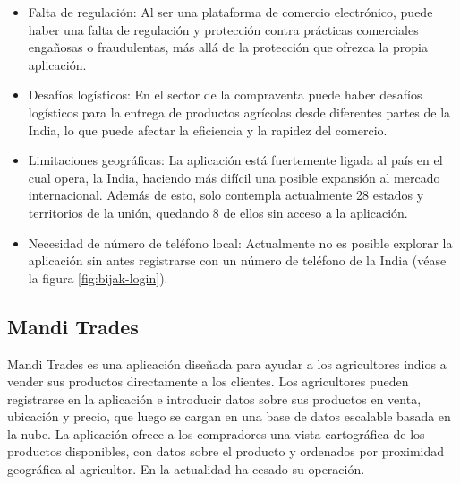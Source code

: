 \begin{itemize}

	\item Falta de regulación: Al ser una plataforma de comercio electrónico, puede haber una falta de regulación y protección contra prácticas comerciales engañosas o fraudulentas, más allá de la protección que ofrezca la propia aplicación.
	
	\item Desafíos logísticos: En el sector de la compraventa puede haber desafíos logísticos para la entrega de productos agrícolas desde diferentes partes de la India, lo que puede afectar la eficiencia y la rapidez del comercio.

	\item Limitaciones geográficas: La aplicación está fuertemente ligada al país en el cual opera, la India, haciendo más difícil una posible expansión al mercado internacional. Además de esto, solo contempla actualmente 28 estados y territorios de la unión, quedando 8 de ellos sin acceso a la aplicación.

	\item Necesidad de número de teléfono local: Actualmente no es posible explorar la aplicación sin antes registrarse con un número de teléfono de la India (véase la figura \ref{fig:bijak-login}).
	
\end{itemize}


\subsection{Mandi Trades}

Mandi Trades es una aplicación diseñada para ayudar a los agricultores indios a vender sus productos directamente a los clientes. Los agricultores pueden registrarse en la aplicación e introducir datos sobre sus productos en venta, ubicación y precio, que luego se cargan en una base de datos escalable basada en la nube. La aplicación ofrece a los compradores una vista cartográfica de los productos disponibles, con datos sobre el producto y ordenados por proximidad geográfica al agricultor. En la actualidad ha cesado su operación.

